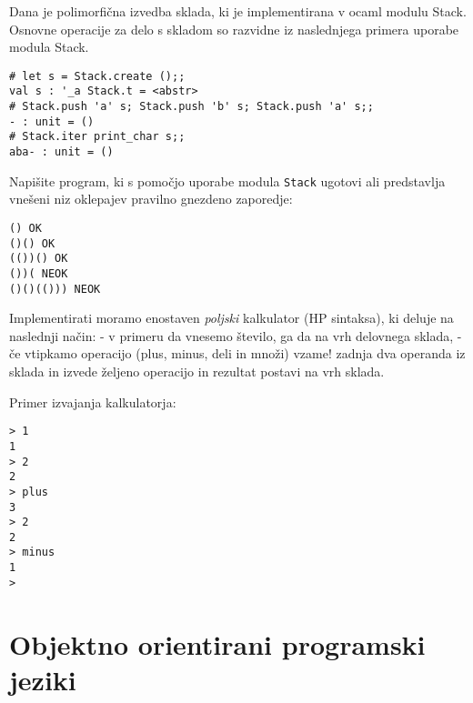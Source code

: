 \begin{ex}
Dana je polimorfi\v cna izvedba sklada, ki je implementirana v ocaml modulu Stack. Osnovne operacije za delo s skladom so razvidne iz naslednjega primera uporabe modula Stack.


\begin{lstlisting}
# let s = Stack.create ();;
val s : '_a Stack.t = <abstr>
# Stack.push 'a' s; Stack.push 'b' s; Stack.push 'a' s;;
- : unit = ()
# Stack.iter print_char s;;
aba- : unit = ()
\end{lstlisting}

Napi\v site program, ki s pomo\v cjo uporabe modula \lstinline{Stack} ugotovi ali predstavlja vne\v seni niz oklepajev pravilno gnezdeno zaporedje:

\begin{lstlisting}
() OK
()() OK
(())() OK
())( NEOK
()()(())) NEOK
\end{lstlisting}

\end{ex}
\begin{ex}
Implementirati moramo enostaven \emph{poljski} kalkulator (HP sintaksa), ki deluje na naslednji na\v cin:
- v primeru da vnesemo \v stevilo, ga da na vrh delovnega sklada,
- \v ce vtipkamo operacijo (plus, minus, deli in mno\v zi) vzame! zadnja dva operanda iz sklada in izvede \v zeljeno operacijo in rezultat postavi na vrh sklada.

Primer izvajanja kalkulatorja:
\begin{lstlisting}
> 1
1
> 2
2
> plus
3
> 2
2
> minus
1
>
\end{lstlisting}
\end{ex}

\chapter{Objektno orientirani programski jeziki}

